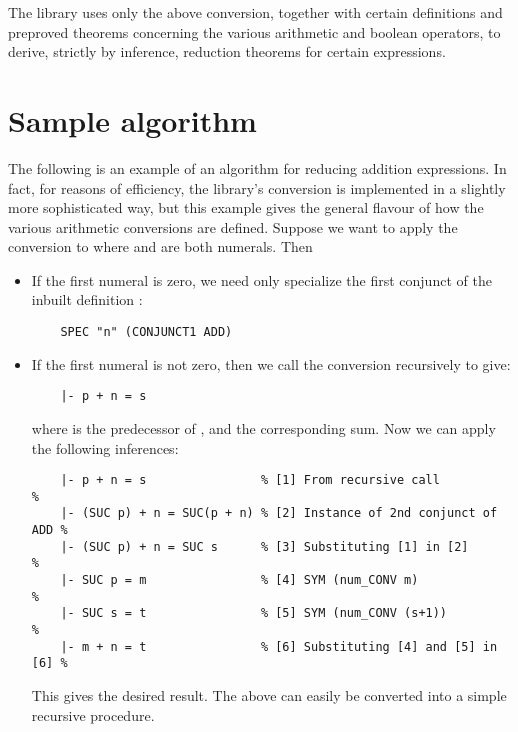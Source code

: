 The  library uses only the above conversion, together with certain
definitions and preproved theorems concerning the various arithmetic and
boolean operators, to derive, strictly by inference, reduction theorems for
certain expressions.


\section{Sample algorithm}

The following is an example of an algorithm for reducing addition expressions.
In fact, for reasons of efficiency, the library's  conversion is
implemented in a slightly more sophisticated way, but this example gives the
general flavour of how the various arithmetic conversions are defined.  Suppose
we want to apply the conversion to  where  and  are
both numerals. Then

\begin{itemize}
  \item If the first numeral is zero, we need only specialize the first
  conjunct of the inbuilt definition :

  {\small\begin{verbatim}
    SPEC "n" (CONJUNCT1 ADD)
  \end{verbatim}}

  \item If the first numeral is not zero, then we call the conversion
  recursively to give:

  {\small\begin{verbatim}
    |- p + n = s
  \end{verbatim}}

  where  is the predecessor of , and  the corresponding sum.
  Now we can apply the following inferences:

  {\small\begin{verbatim}
    |- p + n = s                % [1] From recursive call             %
    |- (SUC p) + n = SUC(p + n) % [2] Instance of 2nd conjunct of ADD %
    |- (SUC p) + n = SUC s      % [3] Substituting [1] in [2]         %
    |- SUC p = m                % [4] SYM (num_CONV m)                %
    |- SUC s = t                % [5] SYM (num_CONV (s+1))            %
    |- m + n = t                % [6] Substituting [4] and [5] in [6] %
  \end{verbatim}}

  This gives the desired result. The above can easily be converted into a
  simple recursive procedure.

\end{itemize}

